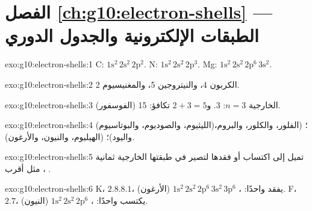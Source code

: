 \section*{الفصل \ref{ch:g10:electron-shells} --- الطبقات الإلكترونية والجدول الدوري}

\begin{solution}{exo:g10:electron-shells:1}
C: $1\mathrm{s}^2\,2\mathrm{s}^2\,2\mathrm{p}^2$. N:
$1\mathrm{s}^2\,2\mathrm{s}^2\,2\mathrm{p}^3$. Mg:
$1\mathrm{s}^2\,2\mathrm{s}^2\,2\mathrm{p}^6\,3\mathrm{s}^2$.
\end{solution}

\begin{solution}{exo:g10:electron-shells:2}
الكربون 4، والنيتروجين 5، والمغنيسيوم 2.
\end{solution}

\begin{solution}{exo:g10:electron-shells:3}
 الخارجية $n = 3$:  3. و$2 + 3 = 5$  تكافؤ:  15
(الفوسفور).
\end{solution}

\begin{solution}{exo:g10:electron-shells:4}
 (الليثيوم، والصوديوم، والبوتاسيوم)؛  (الفلور،
والكلور، والبروم، واليود)؛  (الهيليوم، والنيون، والأرغون).
\end{solution}

\begin{solution}{exo:g10:electron-shells:5}
تميل  إلى اكتساب  أو فقدها لتصير في طبقتها الخارجية ثمانية
، مثل أقرب .
\end{solution}

\begin{solution}{exo:g10:electron-shells:6}
K، $2.8.8.1$، يفقد واحدًا: ،
$1\mathrm{s}^2\,2\mathrm{s}^2\,2\mathrm{p}^6\,3\mathrm{s}^2\,3\mathrm{p}^6$
(الأرغون). F، $2.7$، يكتسب واحدًا: ،
$1\mathrm{s}^2\,2\mathrm{s}^2\,2\mathrm{p}^6$ (النيون).
\end{solution}

